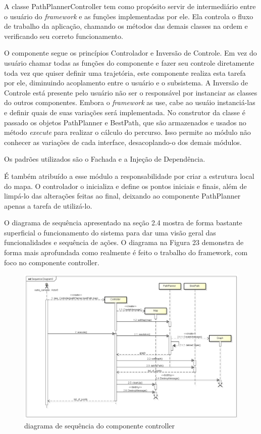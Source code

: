 A classe PathPlannerController tem como propósito servir de intermediário entre o usuário do \textit{framework} e as funções implementadas por ele. Ela controla o fluxo de trabalho da aplicação, chamando os métodos das demais classes na ordem e verificando seu correto funcionamento.

O componente segue os princípios Controlador e Inversão de Controle. Em vez do usuário chamar todas as funções do componente e fazer seu controle diretamente toda vez que quiser definir uma trajetória, este componente realiza esta tarefa por ele, diminuindo acoplamento entre o usuário e o subsistema. A Inversão de Controle está presente pelo usuário não ser o responsável por instanciar as classes do outros componentes. Embora o \textit{framework} as use, cabe ao usuáio instanciá-las e definir quais de suas variações será implementada. No construtor da classe é passado os objetos PathPlanner e BestPath, que são armazenados e usados no método \textit{execute} para realizar o cálculo do percurso. Isso permite ao módulo não conhecer as variações de cada interface, desacoplando-o dos demais módulos.

Os padrões utilizados são o Fachada e a Injeção de Dependência.

É também atribuído a esse módulo a responsabilidade por criar a estrutura local do mapa. O controlador o inicializa e define os pontos iniciais e finais, além de limpá-lo das alterações feitas ao final, deixando ao componente PathPlanner apenas a tarefa de utilizá-lo.

O diagrama de sequência apresentado na seção 2.4 mostra de forma bastante superficial o funcionamento do sistema para dar uma visão geral das funcionalidades e sequência de ações. O diagrama na Figura 23 demonstra de forma mais aprofundada como realmente é feito o trabalho do framework, com foco no componente controller.

\begin{figure}[h]
	\centering
	\label{fig23}
		\includegraphics[keepaspectratio=true,scale=0.4]{figuras/executeController.png}
	\caption{diagrama de sequência do componente controller}
\end{figure}


